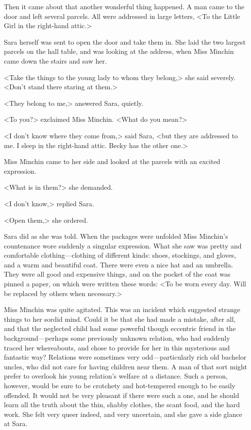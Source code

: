 Then it came about that another wonderful thing happened. A man came to the door and left several parcels. All were addressed in large letters, <To the Little Girl in the right-hand attic.>

Sara herself was sent to open the door and take them in. She laid the two largest parcels on the hall table, and was looking at the address, when Miss Minchin came down the stairs and saw her.

<Take the things to the young lady to whom they belong,> she said severely. <Don't stand there staring at them.>

<They belong to me,> answered Sara, quietly.

<To you?> exclaimed Miss Minchin. <What do you mean?>

<I don't know where they come from,> said Sara, <but they are addressed to me. I sleep in the right-hand attic. Becky has the other one.>

Miss Minchin came to her side and looked at the parcels with an excited expression.

<What is in them?> she demanded.

<I don't know,> replied Sara.

<Open them,> she ordered.

Sara did as she was told. When the packages were unfolded Miss Minchin's countenance wore suddenly a singular expression. What she saw was pretty and comfortable clothing—clothing of different kinds: shoes, stockings, and gloves, and a warm and beautiful coat. There were even a nice hat and an umbrella. They were all good and expensive things, and on the pocket of the coat was pinned a paper, on which were written these words: <To be worn every day. Will be replaced by others when necessary.>

Miss Minchin was quite agitated. This was an incident which suggested strange things to her sordid mind. Could it be that she had made a mistake, after all, and that the neglected child had some powerful though eccentric friend in the background—perhaps some previously unknown relation, who had suddenly traced her whereabouts, and chose to provide for her in this mysterious and fantastic way? Relations were sometimes very odd—particularly rich old bachelor uncles, who did not care for having children near them. A man of that sort might prefer to overlook his young relation's welfare at a distance. Such a person, however, would be sure to be crotchety and hot-tempered enough to be easily offended. It would not be very pleasant if there were such a one, and he should learn all the truth about the thin, shabby clothes, the scant food, and the hard work. She felt very queer indeed, and very uncertain, and she gave a side glance at Sara.

